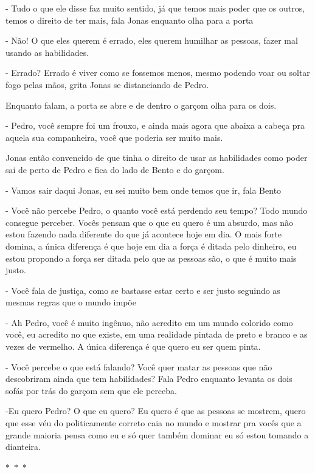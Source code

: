 - Tudo o que ele disse faz muito sentido, já que temos mais poder que os outros, temos o direito de ter mais, fala Jonas enquanto olha para a porta

- Não! O que eles querem é errado, eles querem humilhar as pessoas, fazer mal usando as habilidades.

- Errado? Errado é viver como se fossemos menos, mesmo podendo voar ou soltar fogo pelas mãos, grita Jonas se distanciando de Pedro.


Enquanto falam, a porta se abre e de dentro o garçom olha para os dois.

- Pedro, você sempre foi um frouxo, e ainda mais agora que abaixa a cabeça pra aquela sua companheira, você que poderia ser muito mais.

Jonas então convencido de que tinha o direito de usar as habilidades como poder sai de perto de Pedro e fica do lado de Bento e do garçom.

- Vamos sair daqui Jonas, eu sei muito bem onde temos que ir, fala Bento

- Você não percebe Pedro, o quanto você está perdendo seu tempo? Todo mundo consegue perceber. Vocês pensam que o que eu quero é um absurdo, mas não estou fazendo nada diferente do que já acontece hoje em dia. O mais forte domina, a única diferença é que hoje em dia a força é ditada pelo dinheiro, eu estou propondo a força ser ditada pelo que as pessoas são, o que é muito mais justo.

- Você fala de justiça, como se bastasse estar certo e ser justo seguindo as mesmas regras que o mundo impõe

- Ah Pedro, você é muito ingênuo, não acredito em um mundo colorido como você, eu acredito no que existe, em uma realidade pintada de preto e branco e as vezes de vermelho. A única diferença é que quero eu ser quem pinta.

- Você percebe o que está falando? Você quer matar as pessoas que não descobriram ainda que tem habilidades? Fala Pedro enquanto levanta os dois sofás por trás do garçom sem que ele perceba.

-Eu quero Pedro? O que eu quero? Eu quero é que as pessoas se mostrem, quero que esse véu do politicamente correto caia no mundo e mostrar pra vocês que a grande maioria pensa como eu e só quer também dominar eu só estou tomando a dianteira.

\begin{center}
	$\ast$~$\ast$~$\ast$
\end{center}

